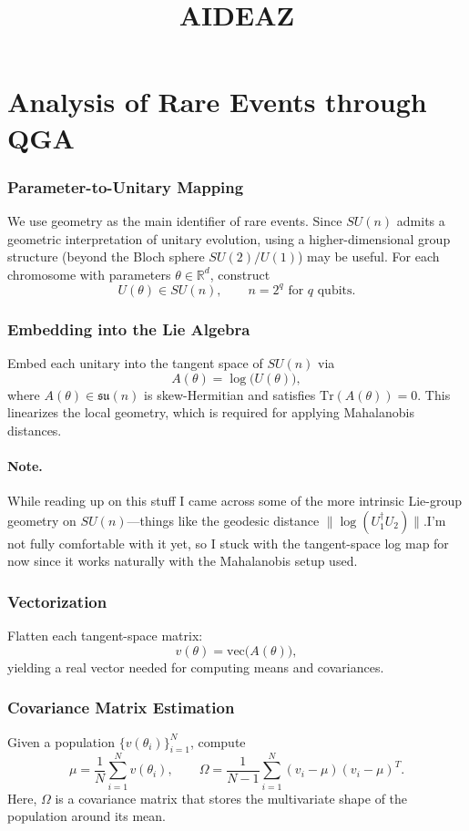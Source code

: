 \documentclass{article}
\title{AIDEAZ}
\author{}
\date{}
\begin{document}
\maketitle


\section{Analysis of Rare Events through QGA}

\subsubsection*{Parameter-to-Unitary Mapping}
We use geometry as the main identifier of rare events. Since $SU(n)$ admits a geometric interpretation of unitary evolution, using a higher-dimensional group structure (beyond the Bloch sphere $SU(2)/U(1)$) may be useful. For each chromosome with parameters $\theta \in \mathbb{R}^d$, construct
\[
U(\theta) \in SU(n), \qquad n = 2^q \text{ for } q \text{ qubits}.
\]

\subsubsection*{Embedding into the Lie Algebra}
Embed each unitary into the tangent space of $SU(n)$ via
\[
A(\theta) = \log\!\big( U(\theta) \big),
\]
where $A(\theta) \in \mathfrak{su}(n)$ is skew-Hermitian and satisfies
$\mathrm{Tr}(A(\theta)) = 0$. This linearizes the local geometry, which is required for applying Mahalanobis distances.

\paragraph{Note.}
While reading up on this stuff I came across some of the more intrinsic Lie-group geometry on $SU(n)$—things like the geodesic distance $\|\log(U_1^\dagger U_2)\|$.I'm not fully comfortable with it yet, so I stuck with the tangent-space log map for now since it works naturally with the Mahalanobis setup used.


\subsubsection*{Vectorization}
Flatten each tangent-space matrix:
\[
v(\theta) = \mathrm{vec}\!\big( A(\theta) \big),
\]
yielding a real vector needed for computing means and covariances.

\subsubsection*{Covariance Matrix Estimation}
Given a population $\{v(\theta_i)\}_{i=1}^N$, compute
\[
\mu = \frac{1}{N}\sum_{i=1}^N v(\theta_i), \qquad
\Omega = \frac{1}{N-1}\sum_{i=1}^N (v_i - \mu)(v_i - \mu)^{T}.
\]
Here, $\Omega$ is a covariance matrix that stores the multivariate shape of the population around its mean.
\end{document}
